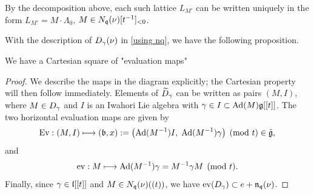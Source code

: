 \documentclass[11pt]{article}
\numberwithin{equation}{section}
\begin{document}
By the decomposition above, each such lattice $L_{M'}$ can be written uniquely in the form $L_{M'} = M\cdot \Lambda_0$,  $M\in N_{\mathfrak{q}}(\nu)[t^{-1}]_{<0}$. 

With the description of $D_\gamma(\nu)$ in \cref{using nq}, we have the following proposition. 

\begin{pro} \label{carterian D_ga} 
    We have a Cartesian square of "evaluation maps"
    \begin{center}
    \end{center}
\end{pro}
\begin{proof}
We describe the maps in the diagram explicitly; the Cartesian property will then follow immediately. Elements of $\widetilde{D}_\gamma$ can be written as pairs $(M,I)$, where $M\in D_\gamma$ and $I$ is an Iwahori Lie algebra with $\gamma\in I\subset \operatorname{Ad}(M)\mathfrak{g}[[t]]$. The two horizontal evaluation maps are given by
$$
\operatorname{Ev}:(M,I)\longmapsto (\mathfrak{b},x):=\bigl(\operatorname{Ad}(M^{-1})I,\;\operatorname{Ad}(M^{-1})\gamma\bigr)\pmod{t}\in\tilde{\mathfrak{g}},
$$
and
$$
\operatorname{ev}:M\longmapsto \operatorname{Ad}(M^{-1})\gamma = M^{-1}\gamma M \pmod{t}.
$$
Finally, since $\gamma\in \mathfrak{l}[[t]]$ and $M\in N_{\mathfrak{q}}(\nu)((t))$, we have $\operatorname{ev}(D_\gamma)\subset e+\mathfrak{n}_{\mathfrak{q}}(\nu)$. 


\end{proof}
\end{document}
